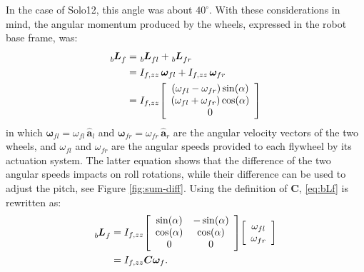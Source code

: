 \documentclass[sensors,article,accept,pdftex,moreauthors]{Definitions/mdpi}
\begin{document}
In the case of Solo12, this angle was about $40^{\circ}$. With these considerations in mind, the angular momentum produced by the wheels, expressed in the robot base frame, was:
\begin{equation}
\begin{split}
\tensor[_b]{\bm{L}}{_f} &= \tensor[_b]{\bm{L}}{_{fl}} + \tensor[_b]{\bm{L}}{_{fr}} \\
&=I_{f, zz} \, \bm{\omega}_{fl} + I_{f, zz} \, \bm{\omega}_{fr}\\
&=I_{f, zz}
\left[\begin{array}{c}
\left(\omega_{fl} - \omega_{fr}\right)\sin(\alpha) \\ 
\left(\omega_{fl} +  \omega_{fr}\right)\cos(\alpha) \\
0
\end{array}\right]
\end{split}
\label{eq:bLf}
\end{equation}
in which $\bm{\omega}_{fl}= \omega_{fl} \, \hat{\bm{a}}_{l}$ and $\bm{\omega}_{fr}= \omega_{fr} \, \hat{\bm{a}}_{r}$ are the angular velocity vectors of the two wheels, and $\omega_{fl}$ and $\omega_{fr}$ are the angular speeds provided to each flywheel by its actuation system. The latter equation shows that the difference of the two angular speeds impacts on roll rotations, while their difference can be used to adjust the pitch, see Figure \ref{fig:sum-diff}. Using the definition of $\bm{C}$, \eqref{eq:bLf} is rewritten as:
\begin{equation}
\begin{split}
\tensor[_b]{\bm{L}}{_f} & = I_{f,zz}
\left[
\begin{array}{cc}
\sin(\alpha) & -\sin(\alpha) \\
\cos(\alpha) & \cos(\alpha) \\
0 & 0
\end{array}
\right]
\left[
\begin{array}{cc}
\omega_{fl} \\
\omega_{fr}
\end{array}
\right] \\
&= I_{f,zz} \bm{C} \bm{\omega}_f.
\end{split}
\end{equation}
\vspace{-6pt}
\end{document}

